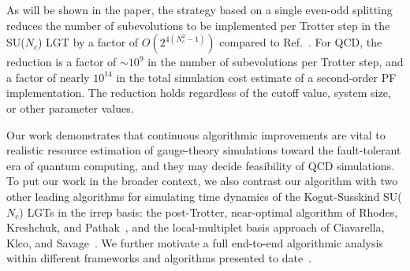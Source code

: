 \documentclass[aps,prd,twocolumn,showpacs,groupedaddress,superscriptaddress,nofootinbib,floatfix,preprintnumbers,longbibliography]{revtex4-1}
\begin{document}
As will be shown in the paper, the strategy based on a single even-odd splitting reduces the number of subevolutions to be implemented per Trotter step in the SU($N_c$) LGT by a factor of $O(2^{4(N_c^2-1)})$ compared to Ref.~\cite{Kan:2021xfc}. For QCD, the reduction is a factor of $\sim10^9$ in the number of subevolutions per Trotter step, and a factor of nearly $10^{14}$ in the total simulation cost estimate of a second-order PF implementation. The reduction holds regardless of the cutoff value, system size, or other parameter values.

Our work demonstrates that continuous algorithmic improvements are vital to realistic resource estimation of gauge-theory simulations toward the fault-tolerant era of quantum computing, and they may decide feasibility of QCD simulations. To put our work in the broader context, we also contrast our algorithm with two other leading algorithms for simulating time dynamics of the Kogut-Susskind SU($N_c$) LGTs in the irrep basis: the post-Trotter, near-optimal algorithm of Rhodes, Kreshchuk, and Pathak~\cite{Rhodes:2024zbr}, and the local-multiplet basis approach of Ciavarella, Klco, and Savage~\cite{Ciavarella:2021nmj}. We further motivate a full end-to-end algorithmic analysis within different frameworks and algorithms presented to date~\cite{Lamm:2019bik,Haase:2020kaj,Murairi:2022zdg,Lamm:2024jnl,Balaji:2025afl,Halimeh:2025ivn,Ciavarella:2024fzw,Froland:2025bqf,Zache:2023dko,Rhodes:2026atz,Webb-Mack:2026bkg}.
\end{document}

